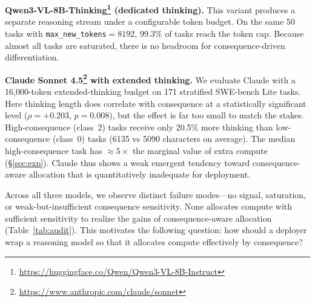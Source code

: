 \documentclass{article}
\begin{document}
\textbf{Qwen3-VL-8B-Thinking\footnote{\url{https://huggingface.co/Qwen/Qwen3-VL-8B-Instruct}} (dedicated thinking).} This variant
produces a separate reasoning stream under a configurable token budget.
On the same 50 tasks with \texttt{max\_new\_tokens}$=8192$, $99.3\%$
of tasks reach the token cap. Because almost all tasks are saturated,
there is no headroom for consequence-driven differentiation.

\textbf{Claude Sonnet 4.5\footnote{\url{https://www.anthropic.com/claude/sonnet}} with extended thinking.} We evaluate Claude 
with a 16,000-token extended-thinking budget on 171 stratified SWE-bench Lite tasks.
Here thinking length does correlate with consequence at a statistically
significant level ($\rho = +0.203$, $p = 0.008$), but the effect is far
too small to match the stakes.  High-consequence (class~2) tasks receive only 20.5\% more thinking than low-consequence (class~0) tasks (6135 vs 5090 characters on average).
The median high-consequence task has $\approx 5\times$ the marginal
value of extra compute (\S\ref{sec:exp}).  Claude thus shows a weak emergent tendency
toward consequence-aware allocation that is quantitatively inadequate for
deployment.

Across all three models, we observe distinct failure modes—no signal,
saturation, or weak-but-insufficient consequence sensitivity. None
allocates compute with sufficient sensitivity to realize the gains of
consequence-aware allocation (Table~\ref{tab:audit}). This motivates
the following question: how should a deployer wrap a reasoning model
so that it allocates compute effectively by consequence?

\begin{table}[h]
\centering
{}
\caption{\textbf{Model audit on SWE-bench Lite.} We report sample size $n$,
configured token budget $\mathrm{max\_new}$, Spearman rank correlation
between thinking length and consequence, $p$-value, average difference
in thinking length between high- and low-consequence tasks, and the
observed failure mode relative to the cost-weighted allocation objective.}
\label{tab:audit}
\end{table}
\end{document}
